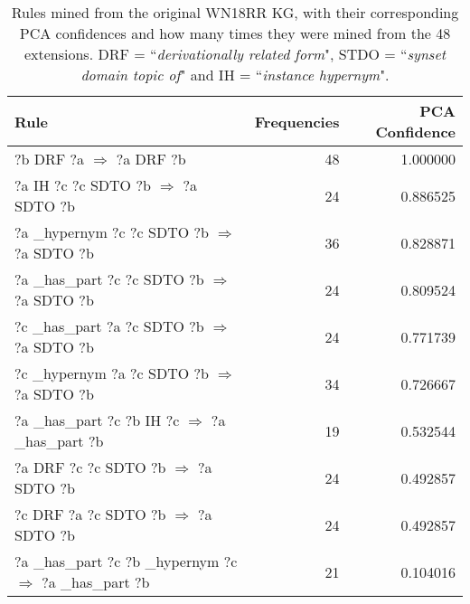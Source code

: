 \begin{table}
\begin{tabular}{lrr}
\toprule
                                                                                                      Rule &  Frequencies &  PCA Confidence \\
\midrule
                            ?b  DRF  ?a   $\Rightarrow$ ?a  DRF  ?b &           48 &        1.000000 \\
          ?a  IH  ?c  ?c  SDTO  ?b   $\Rightarrow$ ?a  SDTO  ?b &           24 &        0.886525 \\
                   ?a  \_hypernym  ?c  ?c  SDTO  ?b   $\Rightarrow$ ?a  SDTO  ?b &           36 &        0.828871 \\
                   ?a  \_has\_part  ?c  ?c  SDTO  ?b   $\Rightarrow$ ?a  SDTO  ?b &           24 &        0.809524 \\
                   ?c  \_has\_part  ?a  ?c  SDTO  ?b   $\Rightarrow$ ?a  SDTO  ?b &           24 &        0.771739 \\
                   ?c  \_hypernym  ?a  ?c  SDTO  ?b   $\Rightarrow$ ?a  SDTO  ?b &           34 &        0.726667 \\
                                      ?a  \_has\_part  ?c  ?b  IH  ?c   $\Rightarrow$ ?a  \_has\_part  ?b &           19 &        0.532544 \\
?a  DRF  ?c  ?c  SDTO  ?b   $\Rightarrow$ ?a  SDTO  ?b &           24 &        0.492857 \\
?c  DRF  ?a  ?c  SDTO  ?b   $\Rightarrow$ ?a  SDTO  ?b &           24 &        0.492857 \\
                                               ?a  \_has\_part  ?c  ?b  \_hypernym  ?c   $\Rightarrow$ ?a  \_has\_part  ?b &           21 &        0.104016 \\
\bottomrule
\end{tabular}
\caption{Rules mined from the original WN18RR KG, with their corresponding PCA confidences and how many times they were mined from the 48 extensions. DRF = ``\textit{derivationally related form}", STDO = ``\textit{synset domain topic of}" and IH = ``\textit{instance hypernym}".}
\label{wn18rr_original_rules_table_PCA}
\end{table}

